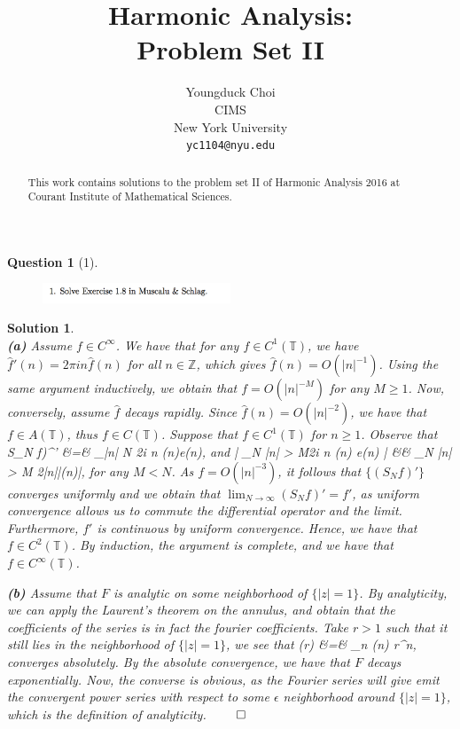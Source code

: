 \documentclass{article} %
\title{Harmonic Analysis:  \\
Problem Set II}
\author{
Youngduck Choi \\
CIMS \\
New York University\\
\texttt{yc1104@nyu.edu} \\
}
\def\eQb#1\eQe{\begin{eqnarray*}#1\end{eqnarray*}}
\theoremstyle{quest}
\newtheorem*{question}{Question}
\newtheorem*{solution}{Solution}
\begin{document}
\maketitle

\begin{abstract}
This work contains solutions to the problem set II
of Harmonic Analysis 2016 at Courant Institute of Mathematical Sciences.
\end{abstract}

\begin{question}[1]
\hfill
\begin{figure}[h!]
  \centering
    \includegraphics[width=0.5\textwidth]{HA-2-1.png}
\end{figure}
\end{question}
\begin{solution} \hfill \\
\textbf{(a)} Assume $ f \in C^{\infty}$. We have that for any $f \in C^{1}(\mathbb{T})$, we have
$\hat{f}'(n) = 2\pi i n \hat{f}(n)$ for all $n \in \mathbb{Z}$, which gives $\hat{f}(n) 
= O(|n|^{-1})$.
Using the same argument inductively, we obtain that $f = O(|n|^{-M})$ for any $M \geq 1$.
Now, conversely, assume $\hat{f}$ decays rapidly.
Since $\hat{f}(n) = O(|n|^{-2})$, we have
that $f \in A(\mathbb{T})$, thus $f \in C(\mathbb{T})$. Suppose that $f \in C^{1}(\mathbb{T})$
for $n \geq 1$. Observe that 
\eQb
(S_N f)^{'} &=& \sum_{|n| \leq N} 2\pi i n (n)e(n),
\eQe  
and
\eQb
\left| \sum_{N \geq |n| > M}2\pi i n (n) e(n) \right| &\leq& 
\sum_{N \geq |n| > M} 2\pi|n||(n)|,
\eQe
for any $M < N$.
As $f = O(|n|^{-3})$, it follows that $\{ (S_N f)' \}$ converges uniformly and we obtain that
$\lim_{N \to \infty} (S_N f)' = f'$, as uniform convergence allows us to commute
the differential operator and the limit. Furthermore, $f'$ is continuous by uniform convergence.
Hence, we have that $f \in C^{2}(\mathbb{T})$.  
By induction, the argument is complete, and we have that $f \in C^{\infty}(\mathbb{T})$.

\bigskip

\textbf{(b)} Assume that $F$ is analytic on some neighborhood of $\{ |z| = 1\}$.
By analyticity, we can apply the Laurent's theorem on the annulus,
and obtain that the coefficients of the series is in fact the fourier coefficients. Take 
$r > 1$ such that it still lies in the neighborhood of $\{|z| = 1\}$, we see that
\eQb
F(r) &=& \sum_{n \in {}} (n) r^{n},
\eQe
converges absolutely. By the absolute convergence, we have that $F$ decays
exponentially. Now, the converse is obvious, as the Fourier series will give emit the
convergent power series with respect to some $\epsilon$ neighborhood around $\{ |z| = 1\}$,
which is the definition of analyticity. \hfill $\qed$
\end{solution}
\end{document}

